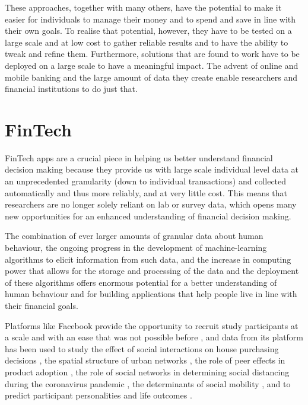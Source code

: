 These approaches, together with many others, have the potential to make it
easier for individuals to manage their money and to spend and save in line with
their own goals. To realise that potential, however, they have to be tested on
a large scale and at low cost to gather reliable results and to have the
ability to tweak and refine them. Furthermore, solutions that are found to work
have to be deployed on a large scale to have a meaningful impact. The advent of
online and mobile banking and the large amount of data they create enable
researchers and financial institutions to do just that.


\section{FinTech}%

FinTech apps are a crucial piece in helping us better understand financial decision making because they provide us with large scale individual level data at an unprecedented granularity (down to individual transactions) and collected automatically and thus more reliably, and at very little cost. This means that researchers are no longer solely reliant on lab or survey data, which opens many new opportunities for an enhanced understanding of financial decision making.

The combination of ever larger amounts of granular data about human behaviour, the ongoing progress in the development of machine-learning
algorithms to elicit information from such data, and the increase in computing power
that allows for the storage and processing of the data and the deployment of
these algorithms offers enormous potential for a better understanding of human
behaviour \citep{jaffe2014big, buyalskaya2021golden} and for building
applications that help people live in line with their financial goals.

Platforms like Facebook provide the opportunity to recruit study participants
at a scale and with an ease that was not possible before
\citep{kosinski2015facebook}, and data from its platform has been used to study the effect of social interactions on
house purchasing decisions \citep{bailey2018economic, bailey2019house}, the
spatial structure of urban networks \citep{bailey2020socialconnectedness}, the role of peer
effects in product adoption \citep{bailey2019peer}, the role of social networks
in determining social distancing during the coronavirus pandemic
\citep{bailey2020socialnetworks}, the determinants of social mobility
\citep{chetty2022sociali, chetty2022socialii}, and to predict participant personalities and life outcomes \citep{youyou2015computer}.

